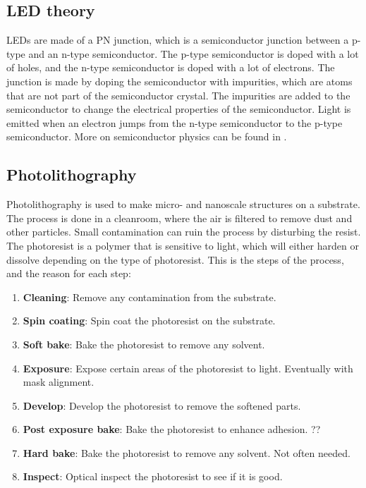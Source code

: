 
\subsection{LED theory}
\label{LEDtheory}
LEDs are made of a PN junction, which is a semiconductor junction between a p-type and an n-type semiconductor.
The p-type semiconductor is doped with a lot of holes, and the n-type semiconductor is doped with a lot of electrons.
The junction is made by doping the semiconductor with impurities, which are atoms that are not part of the semiconductor crystal.
The impurities are added to the semiconductor to change the electrical properties of the semiconductor.
Light is emitted when an electron jumps from the n-type semiconductor to the p-type semiconductor.
More on semiconductor physics can be found in \cite{streetman2015solid}.


\subsection{Photolithography}
\label{photolithography}

Photolithography is used to make micro- and nanoscale structures on a substrate.
The process is done in a cleanroom, where the air is filtered to remove dust and other particles.
Small contamination can ruin the process by disturbing the resist.
The photoresist is a polymer that is sensitive to light, which will either harden or dissolve depending on the type of photoresist.
This is the steps of the process, and the reason for each step:


\begin{enumerate}
    \item \textbf{Cleaning}: Remove any contamination from the substrate.
    \item \textbf{Spin coating}: Spin coat the photoresist on the substrate.
    \item \textbf{Soft bake}: Bake the photoresist to remove any solvent.
    \item \textbf{Exposure}: Expose certain areas of the photoresist to light. Eventually with mask alignment.
    \item \textbf{Develop}: Develop the photoresist to remove the softened parts.
    \item \textbf{Post exposure bake}: Bake the photoresist to enhance adhesion. ??
    \item \textbf{Hard bake}: Bake the photoresist to remove any solvent. Not often needed.
    \item \textbf{Inspect}: Optical inspect the photoresist to see if it is good.
\end{enumerate}

